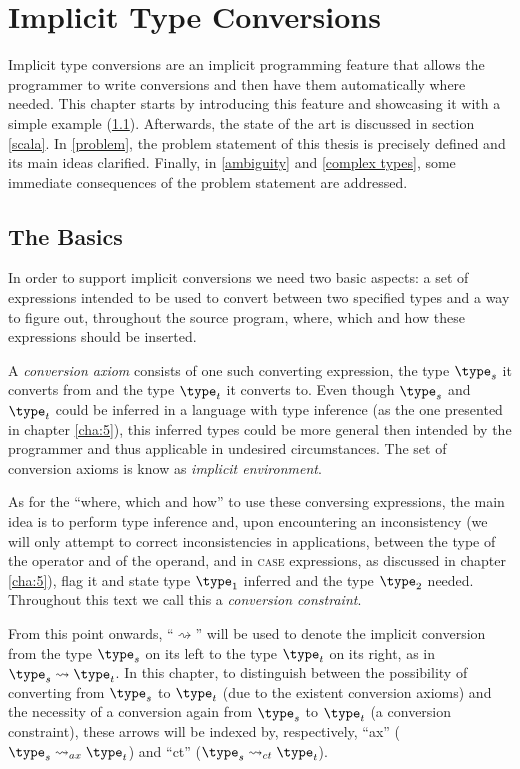 \chapter{Implicit Type Conversions}
\label{cha:4}
Implicit type conversions are an implicit programming feature that allows the programmer to write conversions and then have them automatically where needed. This chapter starts by introducing this feature and showcasing it with a simple example (\ref{itc4}). Afterwards, the state of the art is discussed in section \ref{scala}. In \ref{problem}, the problem statement of this thesis is precisely defined and its main ideas clarified. Finally, in \ref{ambiguity} and \ref{complex types}, some immediate consequences of the problem statement are addressed.

\section{The Basics}
\label{itc4}
In order to support implicit conversions we need two basic aspects: a set of expressions intended to be used to convert between two specified types and a way to figure out, throughout the source program, where, which and how these expressions should be inserted.

A \textit{conversion axiom} consists of one such converting expression, the type $\type_s$ it converts from and the type $\type_t$ it converts to. Even though $\type_s$ and $\type_t$ could be inferred in a language with type inference (as the one presented in chapter \ref{cha:5}), this inferred types could be more general then intended by the programmer and thus applicable in undesired circumstances. The set of conversion axioms is know as \textit{implicit environment}.

As for the ``where, which and how'' to use these conversing expressions, the main idea is to perform type inference and, upon encountering an inconsistency (we will only attempt to correct inconsistencies in applications, between the type of the operator and of the operand, and in \textsc{case} expressions, as discussed in chapter \ref{cha:5}), flag it and state type $\type_1$ inferred and the type $\type_2$ needed. Throughout this text we call this a \textit{conversion constraint}. 

From this point onwards, ``$\rightsquigarrow$'' will be used to denote the implicit conversion from the type $\type_s$ on its left to the type $\type_t$ on its right, as in  $\type_s \rightsquigarrow \type_t$. In this chapter, to distinguish between the possibility of converting from $\type_s$ to $\type_t$ (due to the existent conversion axioms) and the necessity of a conversion again from $\type_s$ to $\type_t$ (a conversion constraint), these arrows will be indexed by, respectively, ``ax'' ($\type_s\rightsquigarrow_{ax}\type_t$) and ``ct'' ($\type_s\rightsquigarrow_{ct}\type_t$).

